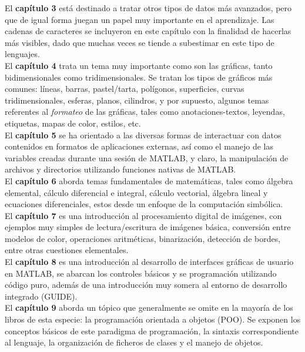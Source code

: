 El \textbf{capítulo 3} está destinado a tratar otros tipos de datos más
avanzados, pero que de igual forma juegan un papel muy importante en el
aprendizaje. Las cadenas de caracteres se incluyeron en este capítulo
con la finalidad de hacerlas más visibles, dado que muchas veces se
tiende a subestimar en este tipo de lenguajes. \\

El \textbf{capítulo 4} trata un tema muy importante como son las
gráficas, tanto bidimensionales como tridimensionales. Se tratan los 
tipos de gráficos más comunes: líneas, barras, pastel/tarta, polígonos, 
superficies, curvas tridimensionales, esferas, planos, cilindros, y 
por supuesto, algunos temas referentes al \textit{formateo} de las gráficas, 
tales como anotaciones-textos, leyendas, etiquetas, mapas de color, estilos, 
etc.\\

El \textbf{capítulo 5} se ha orientado a las diversas formas de
interactuar con datos contenidos en formatos de aplicaciones externas,
así como el manejo de las variables creadas durante una sesión de
MATLAB, y claro, la manipulación de archivos y directorios utilizando
funciones nativas de MATLAB. \\

El \textbf{capítulo 6} aborda temas fundamentales de matemáticas, tales
como álgebra elemental, cálculo diferencial e integral, cálculo
vectorial, álgebra lineal y ecuaciones diferenciales, estos desde un
enfoque de la computación simbólica. \\

El \textbf{capítulo 7} es una introducción al procesamiento digital de
imágenes, con ejemplos muy simples de lectura/escritura de imágenes
básica, conversión entre modelos de color, operaciones aritméticas,
binarización, detección de bordes, entre otras cuestiones elementales. \\

El \textbf{capítulo 8} es una introducción al desarrollo de interfaces
gráficas de usuario en MATLAB, se abarcan los controles básicos y se
programación utilizando código puro, además de una introducción muy
somera al entorno de desarrollo integrado (GUIDE). \\

El \textbf{capítulo 9} aborda un tópico que generalmente se omite en la
mayoría de los libros de esta especie: la programación orientada a
objetos (POO). Se exponen los conceptos básicos de este paradigma de
programación, la sintaxis correspondiente al lenguaje, la organización
de ficheros de clases y el manejo de objetos. \\
 
